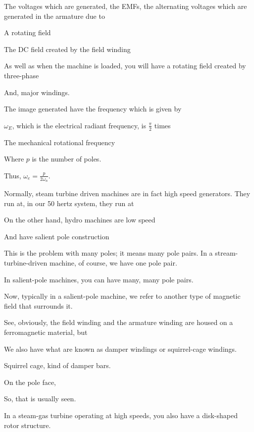 \documentclass{article}
\begin{document}
The voltages which are generated, the EMFs, the alternating voltages which are generated in the armature due to

A rotating field

The DC field created by the field winding

As well as when the machine is loaded, you will have a rotating field created by three-phase

And, major windings.

The image generated have the frequency which is given by

$\omega_E$, which is the electrical radiant frequency, is $\frac{\pi}{2}$ times

The mechanical rotational frequency

Where $p$ is the number of poles.

Thus, $\omega_e = \frac{p}{2\omega_n}$.

Normally, steam turbine driven machines are in fact high speed generators. They run at, in our 50 hertz system, they run at

On the other hand, hydro machines are low speed

And have salient pole construction

This is the problem with many poles; it means many pole pairs. In a stream-turbine-driven machine, of course, we have one pole pair.

In salient-pole machines, you can have many, many pole pairs.

Now, typically in a salient-pole machine, we refer to another type of magnetic field that surrounds it.

See, obviously, the field winding and the armature winding are housed on a ferromagnetic material, but

We also have what are known as damper windings or squirrel-cage windings.

Squirrel cage, kind of damper bars.

On the pole face,

So, that is usually seen.

In a steam-gas turbine operating at high speeds, you also have a disk-shaped rotor structure.
\end{document}
